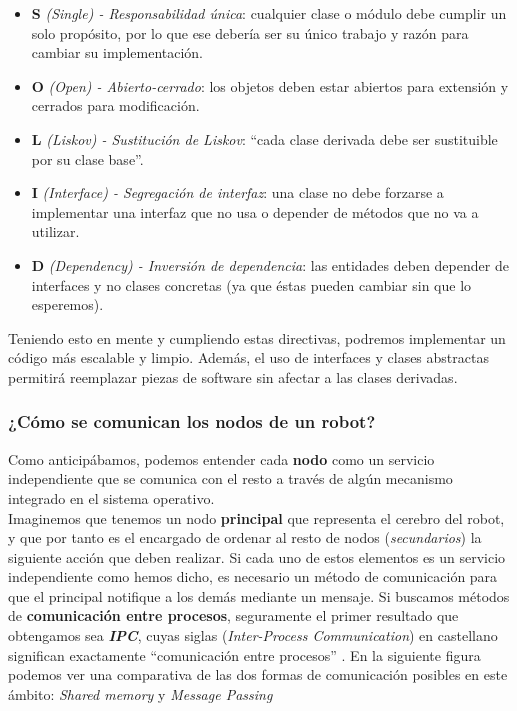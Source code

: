 \begin{itemize}
	\item \textbf{S} \textit{(Single) - Responsabilidad única}: cualquier clase o módulo debe cumplir un solo propósito, por lo que ese debería ser su único trabajo y razón para cambiar su implementación.
	\item \textbf{O} \textit{(Open) - Abierto-cerrado}: los objetos deben estar abiertos para extensión y cerrados para modificación.
	\item \textbf{L} \textit{(Liskov) - Sustitución de Liskov}: ``cada clase derivada debe ser sustituible por su clase base''.
	\item \textbf{I} \textit{(Interface) - Segregación de interfaz}: una clase no debe forzarse a implementar una interfaz que no usa o depender de métodos que no va a utilizar.
	\item \textbf{D} \textit{(Dependency) - Inversión de dependencia}: las entidades deben depender de interfaces y no clases concretas (ya que éstas pueden cambiar sin que lo esperemos).
\end{itemize}

Teniendo esto en mente y cumpliendo estas directivas, podremos implementar un código más escalable y limpio. Además, el uso de interfaces y clases abstractas permitirá reemplazar piezas de software sin afectar a las clases derivadas.\\


\subsubsection{¿Cómo se comunican los nodos de un robot?}

Como anticipábamos, podemos entender cada \textbf{nodo} como un servicio independiente que se comunica con el resto a través de algún mecanismo integrado en el sistema operativo.\\

Imaginemos que tenemos un nodo \textbf{principal} que representa el cerebro del robot, y que por tanto es el encargado de ordenar al resto de nodos (\textit{secundarios}) la siguiente acción que deben realizar. Si cada uno de estos elementos es un servicio independiente como hemos dicho, es necesario un método de comunicación para que el principal notifique a los demás mediante un mensaje. Si buscamos métodos de \textbf{comunicación entre procesos}, seguramente el primer resultado que obtengamos sea \textbf{\textit{IPC}}, cuyas siglas (\textit{Inter-Process Communication}) en castellano significan exactamente ``comunicación entre procesos'' \cite{ipc}. En la siguiente figura podemos ver una comparativa de las dos formas de comunicación posibles en este ámbito: \textit{Shared memory} y \textit{Message Passing}\\

